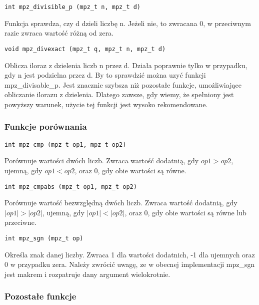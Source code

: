 \documentclass[twoside,a4paper]{book}
\begin{document}
\begin{lstlisting}
int mpz_divisible_p (mpz_t n, mpz_t d)
\end{lstlisting}

Funkcja sprawdza, czy d dzieli liczbę n. Jeżeli nie, to zwracana 0, w przeciwnym razie zwraca wartość różną od zera.

\begin{lstlisting}
void mpz_divexact (mpz_t q, mpz_t n, mpz_t d)
\end{lstlisting}

Oblicza iloraz z dzielenia liczb n przez d. Działa poprawnie tylko w przypadku, gdy n jest podzielna przez d. By to sprawdzić można uzyć funkcji mpz\_divisable\_p. Jest znacznie szybsza niż pozostałe funkcje, umożliwiające obliczanie ilorazu z dzielenia. Dlatego zawsze, gdy wiemy, że spełniony jest powyższy warunek, użycie tej funkcji jest wysoko rekomendowane.

\subsubsection{Funkcje porównania}

\begin{lstlisting}
int mpz_cmp (mpz_t op1, mpz_t op2)
\end{lstlisting}

Porównuje wartości dwóch liczb. Zwraca wartość dodatnią, gdy $op1>op2$, ujemną, gdy $op1<op2$, oraz 0, gdy obie wartości są równe.

\begin{lstlisting}
int mpz_cmpabs (mpz_t op1, mpz_t op2)
\end{lstlisting}

Porównuje wartość bezwzględną dwóch liczb. Zwraca wartość dodatnią, gdy $|op1|>|op2|$, ujemną, gdy $|op1|<|op2|$, oraz 0, gdy obie wartości są równe lub przeciwne.

\begin{lstlisting}
int mpz_sgn (mpz_t op)
\end{lstlisting}

Określa znak danej liczby. Zwraca 1 dla wartości dodatnich, -1 dla ujemnych oraz 0 w przypadku zera. Należy zwrócić uwagę, ze w obecnej implementacji mpz\_sgn jest makrem i rozpatruje dany argument wielokrotnie.

\subsubsection{Pozostałe funkcje}
\end{document}
